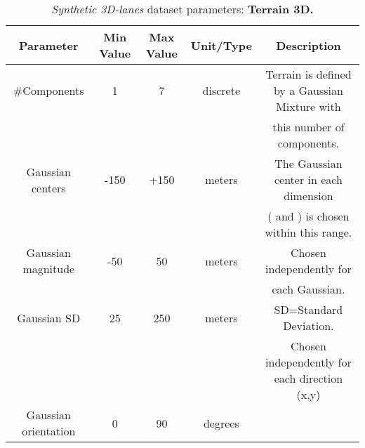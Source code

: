 \documentclass[10pt,twocolumn,letterpaper]{article}
\begin{document}
\setlength{\heavyrulewidth}{1.5pt}
\setlength{\abovetopsep}{4pt}
\begin{table*}[h]
	\centering
	\caption{\emph{Synthetic 3D-lanes} dataset parameters: \textbf{Terrain 3D.}}
	\begin{tabular} {*5c}
		\toprule
		\textbf{Parameter} &  \textbf{Min Value} &  \textbf{Max Value} & \textbf{Unit/Type} & \textbf{Description}  \\
		\toprule 
		\#Components   & 1 & 7 & discrete & Terrain is defined by a Gaussian Mixture with \\
		& & & &  this number of components.\\
		\midrule
		Gaussian centers   & -150 & +150 & meters & The Gaussian center in each dimension \\
		& & & & ( and ) is chosen within this range.\\
		\midrule
		
		Gaussian magnitude & -50 & 50 & meters & Chosen independently for \\
		& & & & each Gaussian. \\
		\midrule
		Gaussian SD & 25 & 250 & meters & SD=Standard Deviation.\\
		& & & & Chosen independently for each direction (x,y)\\
		\midrule
		Gaussian orientation & 0 & 90 & degrees &\\
		\bottomrule
	\end{tabular} 
	\label{tab:params1}
\end{table*}
\end{document}
